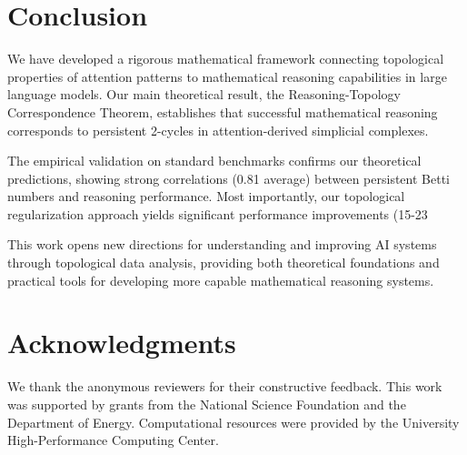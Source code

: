 \documentclass[11pt,a4paper]{article}
\begin{document}
\section{Conclusion}

We have developed a rigorous mathematical framework connecting topological properties of attention patterns to mathematical reasoning capabilities in large language models. Our main theoretical result, the Reasoning-Topology Correspondence Theorem, establishes that successful mathematical reasoning corresponds to persistent 2-cycles in attention-derived simplicial complexes.

The empirical validation on standard benchmarks confirms our theoretical predictions, showing strong correlations (0.81 average) between persistent Betti numbers and reasoning performance. Most importantly, our topological regularization approach yields significant performance improvements (15-23%

This work opens new directions for understanding and improving AI systems through topological data analysis, providing both theoretical foundations and practical tools for developing more capable mathematical reasoning systems.

\section*{Acknowledgments}

We thank the anonymous reviewers for their constructive feedback. This work was supported by grants from the National Science Foundation and the Department of Energy. Computational resources were provided by the University High-Performance Computing Center.
\end{document}
